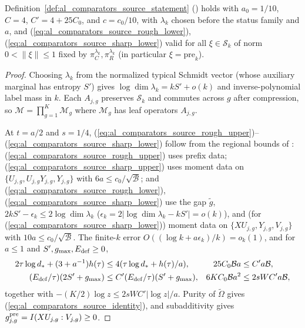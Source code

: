 \begin{lemma}
    \label{thm:al_comparators_source}
    \leanok
    Definition~\ref{def:al_comparators_source_statement} (\cite[Proposition~8.1]{OpenAI2026AreaLaw}) holds with $a_0=1/10$, $C=4$, $C'=4+25C_0$, and $c=c_0/10$, with $\lambda_k$ chosen before the status family and $a$, and (\ref{eq:al_comparators_source_rough_lower}), (\ref{eq:al_comparators_source_sharp_lower}) valid for all $\xi\in\mathcal S_k$ of norm $0<\|\xi\|\le1$ fixed by $\pi_C^{\lambda_k},\pi_R^{\lambda_k}$ (in particular $\xi=\mathrm{pre}_k$).
\end{lemma}

\begin{proof}
    \leanok
    Choosing $\lambda_k$ from the normalized typical Schmidt vector (whose auxiliary marginal has entropy $S'$) gives $\log\dim\lambda_k=kS'+o(k)$ and inverse-polynomial label mass in $k$.
    Each $A_{j,g}$ preserves $\mathcal S_k$ and commutes across $g$ after compression, so $\mathcal M=\prod_{g=1}^K\mathcal M_g$ where $\mathcal M_g$ has leaf operators $A_{j,g}$.

    At $t=a/2$ and $s=1/4$, (\ref{eq:al_comparators_source_rough_upper})--(\ref{eq:al_comparators_source_sharp_lower}) follow from the regional bounds of \cite[Section~8]{OpenAI2026AreaLaw}: (\ref{eq:al_comparators_source_rough_upper}) uses prefix data; (\ref{eq:al_comparators_source_sharp_upper}) uses moment data on $\{U_{j,g},U_{j,g}Y_{j,g},Y_{j,g}\}$ with $6a\le c_0/\sqrt{\mathcal B}$; and (\ref{eq:al_comparators_source_rough_lower}), (\ref{eq:al_comparators_source_sharp_lower}) use the gap $\widetilde g$, $2kS'-\epsilon_k\le2\log\dim\lambda_k$ ($\epsilon_k=2|\log\dim\lambda_k-kS'|=o(k)$), and (for (\ref{eq:al_comparators_source_sharp_lower})) moment data on $\{XU_{j,g},Y_{j,g},V_{j,g}\}$ with $10a\le c_0/\sqrt{\mathcal B}$.
    The finite-$k$ error $O((\log k+a\epsilon_k)/k)=o_k(1)$, and for $a\le1$ and $S',g_{\max},E_{\rm def}\ge0$,
    \begin{align}
        2\tau\log d_*+(3+a^{-1})h(\tau)  & \le 4(\tau\log d_*+h(\tau)/a),         &
        25C_0\mathcal Ba                 & \le C'a\mathcal B, \notag                \\
        (E_{\rm def}/\tau)(2S'+g_{\max}) & \le C'(E_{\rm def}/\tau)(S'+g_{\max}), &
        6KC_0\mathcal Ba^2               & \le 2sWC'a\mathcal B, \notag
    \end{align}
    together with $-(K/2)\log z\le2sWC'|\log z|/a$.
    Purity of $\widetilde\Omega$ gives (\ref{eq:al_comparators_source_identity}), and subadditivity gives $g^{\rm pre}_{j,g}=I(XU_{j,g}:V_{j,g})\ge0$.
\end{proof}
